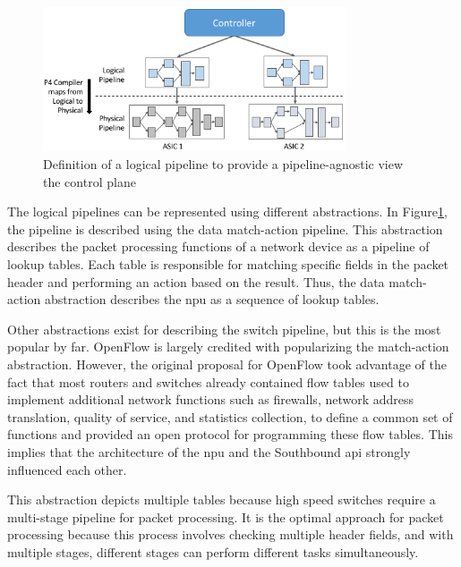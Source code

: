 \begin{figure}
	\centering
	\includegraphics[width=0.8\textwidth]{Chapters/Figures/SDNs/pipeline_abstraction.png}
	\caption{Definition of a logical pipeline to provide a pipeline-agnostic view the control plane\cite{peterson_software-defined_2021}}
	\label{fig:pipeline_abstraction}
\end{figure}


The logical pipelines can be represented using different abstractions. In Figure\ref{fig:pipeline_abstraction}, the pipeline is described using the data match-action pipeline. This abstraction describes the packet processing functions of a network device as a pipeline of lookup tables. Each table is responsible for matching specific fields in the packet header and performing an action based on the result\cite{bifulco_survey_2018}\cite{kreutz_software-defined_2015}. Thus, the data match-action abstraction describes the \gls{npu} as a sequence of lookup tables. 

Other abstractions exist for describing the switch pipeline, but this is the most popular by far. OpenFlow is largely credited with popularizing the match-action abstraction\cite{bifulco_survey_2018}. However, the original proposal for OpenFlow took advantage of the fact that most routers and switches already contained flow tables used to implement additional network functions such as firewalls, network address translation, quality of service, and statistics collection, to define a common set of functions and provided an open protocol for programming these flow tables\cite{mckeown_openflow_2008}. This implies that the architecture of the \gls{npu} and the Southbound \gls{api} strongly influenced each other.

This abstraction depicts multiple tables because high speed switches require a multi-stage pipeline for packet processing. It is the optimal approach for packet processing because this process involves checking multiple header fields, and with multiple stages, different stages can perform different tasks simultaneously\cite{peterson_software-defined_2021}. 

